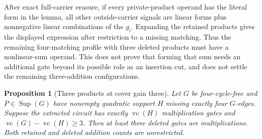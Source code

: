 \documentclass[11pt]{article}
\newcommand{\Sup}{\operatorname{Sup}}
\newcommand{\vc}{\operatorname{vc}}
\newtheorem{proposition}[theorem]{Proposition}
\theoremstyle{definition}
\theoremstyle{remark}
\begin{document}
After exact full-carrier erasure, if every private-product operand has the literal form in the lemma, all other outside-carrier signals are linear forms plus nonnegative linear combinations of the $g_i$. Expanding the retained products gives the displayed expression after restriction to a missing matching. Thus the remaining four-matching profile with three deleted products must have a nonlinear-sum operand. This does not prove that forming that sum needs an additional gate beyond its possible role as an insertion cut, and does not settle the remaining three-addition configurations.

\begin{proposition}[Three products at cover gain three]\label{prop:gainthreeproducts}
Let $G$ be four-cycle-free and $P\in\Sup(G)$ have nonempty quadratic support $H$ missing exactly four $G$-edges. Suppose the extracted circuit has exactly $\vc(H)$ multiplication gates and $\vc(G)-\vc(H)\ge3$. Then at least three deleted gates are multiplications. Both retained and deleted addition counts are unrestricted.
\end{proposition}
\end{document}
